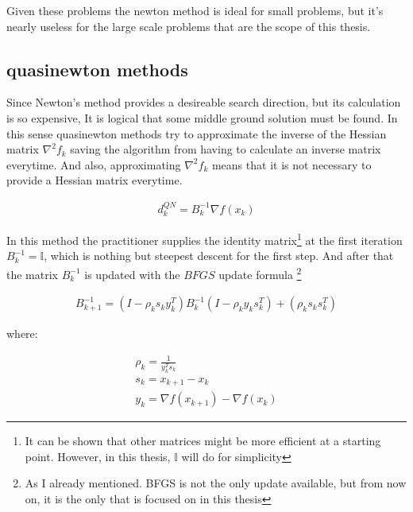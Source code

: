 Given these problems the newton method is ideal for small problems, but it's nearly useless for the large scale problems that are the scope of this thesis.

\subsection{quasinewton methods}

Since Newton's method provides a desireable search direction, but its calculation is so expensive, It is logical that some middle ground solution must be found.  In this sense quasinewton methods try to approximate the inverse of the Hessian matrix $\nabla^2 f_k$ saving the algorithm from having to calculate an inverse matrix everytime.  And also, approximating $\nabla^2 f_k$ means that it is not necessary to provide a Hessian matrix everytime.

\begin{equation}
  \begin{aligned}
    d_k^{QN} = B_k^{-1} \nabla f(x_k)
  \end{aligned}
\end{equation}

In this method the practitioner supplies the identity matrix\footnote{It can be shown that other matrices might be more efficient at a starting point.  However, in this thesis, $\mathbb{I}$ will do for simplicity} at the first iteration $B_k^{-1} = \mathbb{I}$, which is nothing but steepest descent for the first step.  And after that the matrix $B_k^{-1}$ is updated with the $BFGS$ update formula \footnote{As I already mentioned.  BFGS is not the only update available, but from now on, it is the only that is focused on in this thesis}

\begin{equation} \label{BFGSUpdate}
  \begin{aligned}
    B_{k+1} ^{-1} = (I - \rho_k s_k y_k^T) B_k^{-1} (I - \rho_k y_k s_k^T) + (\rho_k s_k s_k^T)
  \end{aligned}
\end{equation} 

where:

\begin{equation*}
  \begin{aligned}
   \rho_k = \frac{1}{y_k^T s_k} \\
    s_k = x_{k+1} - x_k \\
    y_k = \nabla f(x_{k+1}) - \nabla f(x_k)
  \end{aligned}
\end{equation*} 

